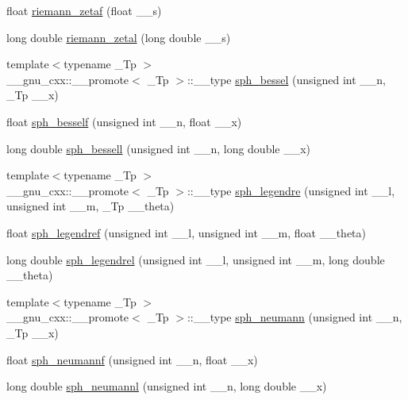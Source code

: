 \begin{DoxyCompactItemize}
\item 
float \hyperlink{group__tr29124__math__spec__func_gaf92063315061a56d3e2c4053156d968e}{riemann\+\_\+zetaf} (float \+\_\+\+\_\+s)
\item 
long double \hyperlink{group__tr29124__math__spec__func_ga1e92da3b878d75270f38d3ec9b513086}{riemann\+\_\+zetal} (long double \+\_\+\+\_\+s)
\item 
{\footnotesize template$<$typename \+\_\+\+Tp $>$ }\\\+\_\+\+\_\+gnu\+\_\+cxx\+::\+\_\+\+\_\+promote$<$ \+\_\+\+Tp $>$\+::\+\_\+\+\_\+type \hyperlink{group__tr29124__math__spec__func_ga478e517ed975bcb256de230e64f0fda5}{sph\+\_\+bessel} (unsigned int \+\_\+\+\_\+n, \+\_\+\+Tp \+\_\+\+\_\+x)
\item 
float \hyperlink{group__tr29124__math__spec__func_ga534e36e1dcefad8daec98920db16eec4}{sph\+\_\+besself} (unsigned int \+\_\+\+\_\+n, float \+\_\+\+\_\+x)
\item 
long double \hyperlink{group__tr29124__math__spec__func_ga11d72b1af81ce9da3c878a25087ee927}{sph\+\_\+bessell} (unsigned int \+\_\+\+\_\+n, long double \+\_\+\+\_\+x)
\item 
{\footnotesize template$<$typename \+\_\+\+Tp $>$ }\\\+\_\+\+\_\+gnu\+\_\+cxx\+::\+\_\+\+\_\+promote$<$ \+\_\+\+Tp $>$\+::\+\_\+\+\_\+type \hyperlink{group__tr29124__math__spec__func_ga573842c12247b87746b548f1945755a8}{sph\+\_\+legendre} (unsigned int \+\_\+\+\_\+l, unsigned int \+\_\+\+\_\+m, \+\_\+\+Tp \+\_\+\+\_\+theta)
\item 
float \hyperlink{group__tr29124__math__spec__func_gaae635d28c06a3be2679901b382090852}{sph\+\_\+legendref} (unsigned int \+\_\+\+\_\+l, unsigned int \+\_\+\+\_\+m, float \+\_\+\+\_\+theta)
\item 
long double \hyperlink{group__tr29124__math__spec__func_ga2f6618dea1847f09fd67f3c974c1910d}{sph\+\_\+legendrel} (unsigned int \+\_\+\+\_\+l, unsigned int \+\_\+\+\_\+m, long double \+\_\+\+\_\+theta)
\item 
{\footnotesize template$<$typename \+\_\+\+Tp $>$ }\\\+\_\+\+\_\+gnu\+\_\+cxx\+::\+\_\+\+\_\+promote$<$ \+\_\+\+Tp $>$\+::\+\_\+\+\_\+type \hyperlink{group__tr29124__math__spec__func_ga1cf4362a67ab5bae9e6b69c867e85371}{sph\+\_\+neumann} (unsigned int \+\_\+\+\_\+n, \+\_\+\+Tp \+\_\+\+\_\+x)
\item 
float \hyperlink{group__tr29124__math__spec__func_ga789143122fa99536329bc2d1b1aac2f0}{sph\+\_\+neumannf} (unsigned int \+\_\+\+\_\+n, float \+\_\+\+\_\+x)
\item 
long double \hyperlink{group__tr29124__math__spec__func_ga3cededa9b6e4601f190c3811e6aabfd6}{sph\+\_\+neumannl} (unsigned int \+\_\+\+\_\+n, long double \+\_\+\+\_\+x)
\end{DoxyCompactItemize}
